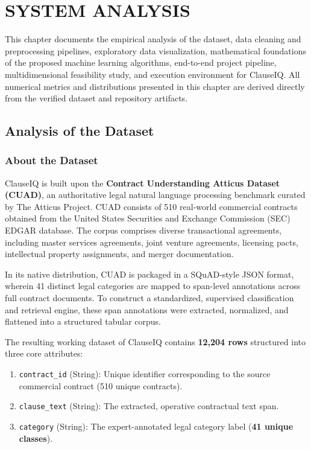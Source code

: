 \chapter{SYSTEM ANALYSIS}
\label{ch:system_analysis}

This chapter documents the empirical analysis of the dataset, data cleaning and preprocessing pipelines, exploratory data visualization, mathematical foundations of the proposed machine learning algorithms, end-to-end project pipeline, multidimensional feasibility study, and execution environment for ClauseIQ. All numerical metrics and distributions presented in this chapter are derived directly from the verified dataset and repository artifacts.

\section{Analysis of the Dataset}
\label{sec:dataset_analysis}

\subsection{About the Dataset}
\label{subsec:about_dataset}
ClauseIQ is built upon the \textbf{Contract Understanding Atticus Dataset (CUAD)}, an authoritative legal natural language processing benchmark curated by The Atticus Project. CUAD consists of 510 real-world commercial contracts obtained from the United States Securities and Exchange Commission (SEC) EDGAR database. The corpus comprises diverse transactional agreements, including master services agreements, joint venture agreements, licensing pacts, intellectual property assignments, and merger documentation.

In its native distribution, CUAD is packaged in a SQuAD-style JSON format, wherein 41 distinct legal categories are mapped to span-level annotations across full contract documents. To construct a standardized, supervised classification and retrieval engine, these span annotations were extracted, normalized, and flattened into a structured tabular corpus.

The resulting working dataset of ClauseIQ contains \textbf{12,204 rows} structured into three core attributes:
\begin{enumerate}
    \item \texttt{contract\_id} (String): Unique identifier corresponding to the source commercial contract (510 unique contracts).
    \item \texttt{clause\_text} (String): The extracted, operative contractual text span.
    \item \texttt{category} (String): The expert-annotated legal category label (\textbf{41 unique classes}).
\end{enumerate}

